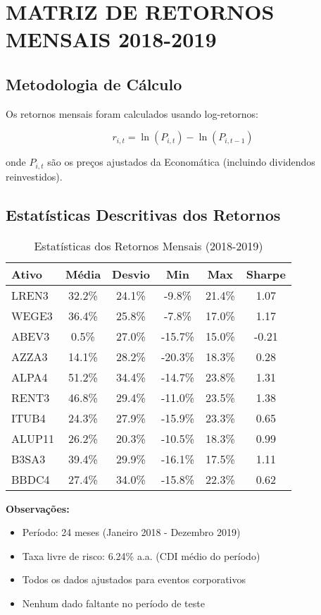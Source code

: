 \section{MATRIZ DE RETORNOS MENSAIS 2018-2019}

\subsection{Metodologia de Cálculo}

Os retornos mensais foram calculados usando log-retornos:

\begin{equation}
r_{i,t} = \ln(P_{i,t}) - \ln(P_{i,t-1})
\end{equation}

onde $P_{i,t}$ são os preços ajustados da Economática (incluindo dividendos reinvestidos).

\subsection{Estatísticas Descritivas dos Retornos}

\begin{table}[H]
\centering
\caption{Estatísticas dos Retornos Mensais (2018-2019)}
\begin{tabular}{|l|c|c|c|c|c|}
\hline
\textbf{Ativo} & \textbf{Média} & \textbf{Desvio} & \textbf{Min} & \textbf{Max} & \textbf{Sharpe} \\
\hline
LREN3 & 32.2\% & 24.1\% & -9.8\% & 21.4\% & 1.07 \\
WEGE3 & 36.4\% & 25.8\% & -7.8\% & 17.0\% & 1.17 \\
ABEV3 & 0.5\% & 27.0\% & -15.7\% & 15.0\% & -0.21 \\
AZZA3 & 14.1\% & 28.2\% & -20.3\% & 18.3\% & 0.28 \\
ALPA4 & 51.2\% & 34.4\% & -14.7\% & 23.8\% & 1.31 \\
RENT3 & 46.8\% & 29.4\% & -11.0\% & 23.5\% & 1.38 \\
ITUB4 & 24.3\% & 27.9\% & -15.9\% & 23.3\% & 0.65 \\
ALUP11 & 26.2\% & 20.3\% & -10.5\% & 18.3\% & 0.99 \\
B3SA3 & 39.4\% & 29.9\% & -16.1\% & 17.5\% & 1.11 \\
BBDC4 & 27.4\% & 34.0\% & -15.8\% & 22.3\% & 0.62 \\
\hline
\end{tabular}
\end{table}

\textbf{Observações:}
\begin{itemize}
    \item Período: 24 meses (Janeiro 2018 - Dezembro 2019)
    \item Taxa livre de risco: 6.24\% a.a. (CDI médio do período)
    \item Todos os dados ajustados para eventos corporativos
    \item Nenhum dado faltante no período de teste
\end{itemize}

